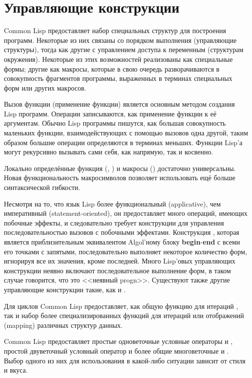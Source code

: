 \else

\chapter{Управляющие конструкции}
\label{CONTRL}

Common Lisp предоставляет набор специальных структур для построения
программ. Некоторые из них связаны со порядком выполнения (управляющие
структуры), тогда как другие с управлением доступа к переменным (структурам
окружения).
Некоторые из этих возможностей реализованы как специальные формы;
другие как макросы, которые в свою очередь разворачиваются в совокупность
фрагментов программы, выраженных в терминах специальных форм или других
макросов.

Вызов функции (применение функции) является основным методом создания Lisp
программ. Операции записываются, как применение функции к её аргументам. Обычно
Lisp программы пишутся, как большая совокупность маленьких функции,
взаимодействующих с помощью вызовов одна другой, таким образом большие операции
определяются в терминах меньших.
Функции Lisp'а могут рекурсивно вызывать сами себя, как напрямую, так и косвенно.

Локально определённые функция (, ) и макросы
() достаточно универсальны.
Новая функциональность макросимволов позволяет использовать ещё больше синтаксической гибкости.

Несмотря на то, что язык Lisp более функциональный (applicative), чем императивный
(statement-oriented), он предоставляет много операций, имеющих побочные эффекты,
и следовательно требует конструкции для управления последовательностью вызовов с
побочными эффектами. Конструкция , которая является приблизительным
эквивалентом Algol'ному блоку \textbf{begin}-\textbf{end} с всеми его точками с
запятыми, последовательно выполняет некоторое количество форм, игнорируя все их
значения, кроме последней.
Много Lisp'овых управляющих конструкции неявно включают последовательное
выполнение форм, в таком случае говорится, что это <<неявный progn>>.
Существуют также другие управляющие конструкции такие, как  и
.

Для циклов Common Lisp предоставляет, как общую функцию для итераций ,
так и набор более специализированных функций для итераций или отображений
(mapping) различных структур данных.

Common Lisp предоставляет простые одноветочные условные операторы  и
, простой двуветочный условный оператор  и более общие
многоветочные  и . Выбор одного из них для использования в
какой-либо ситуации зависит от стиля и вкуса.

